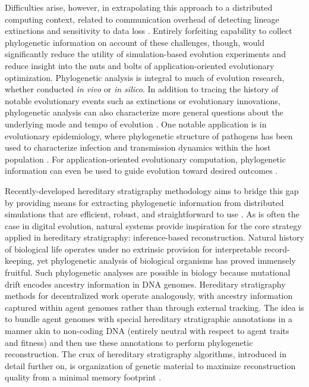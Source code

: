 Difficulties arise, however, in extrapolating this approach to a distributed computing context, related to communication overhead of detecting lineage extinctions and sensitivity to data loss \citep{moreno2024algorithms}.
Entirely forfeiting capability to collect phylogenetic information on account of these challenges, though, would significantly reduce the utility of simulation-based evolution experiments and reduce insight into the nuts and bolts of application-oriented evolutionary optimization.
Phylogenetic analysis is integral to much of evolution research, whether conducted \textit{in vivo} or \textit{in silico}\citep{faithConservationEvaluationPhylogenetic1992, STAMATAKIS2005phylogenetics,frenchHostPhylogenyShapes2023,kim2006discovery,lewinsohnStatedependentEvolutionaryModels2023a,lenski2003evolutionary}.
In addition to tracing the history of notable evolutionary events such as extinctions or evolutionary innovations, phylogenetic analysis can also characterize more general questions about the underlying mode and tempo of evolution \citep{moreno2023toward,hernandez2022can,shahbandegan2022untangling,lewinsohnStatedependentEvolutionaryModels2023a}.
One notable application is in evolutionary epidemiology, where phylogenetic structure of pathogens has been used to characterize infection and transmission dynamics within the host population \citep{giardina2017inference,voznica2022deep}.
For application-oriented evolutionary computation, phylogenetic information can even be used to guide evolution toward desired outcomes \citep{lalejini2024phylogeny,lalejini2024runtime,murphy2008simple,burke2003increased}.

Recently-developed hereditary stratigraphy methodology aims to bridge this gap by providing means for extracting phylogenetic information from distributed simulations that are efficient, robust, and straightforward to use \citep{moreno2022hereditary}.
As is often the case in digital evolution, natural systems provide inspiration for the core strategy applied in hereditary stratigraphy: inference-based reconstruction.
Natural history of biological life operates under no extrinsic provision for interpretable record-keeping, yet phylogenetic analysis of biological organisms has proved immensely fruitful.
Such phylogenetic analyses are possible in biology because mutational drift encodes ancestry information in DNA genomes.
Hereditary stratigraphy methods for decentralized work operate analogously, with ancestry information captured within agent genomes rather than through external tracking.
The idea is to bundle agent genomes with special hereditary stratigraphic annotations in a manner akin to non-coding DNA (entirely neutral with respect to agent traits and fitness) and then use these annotations to perform phylogenetic reconstruction.
The crux of hereditary stratigraphy algorithms, introduced in detail further on, is organization of genetic material to maximize reconstruction quality from a minimal memory footprint \citep{moreno2022hereditary}.

